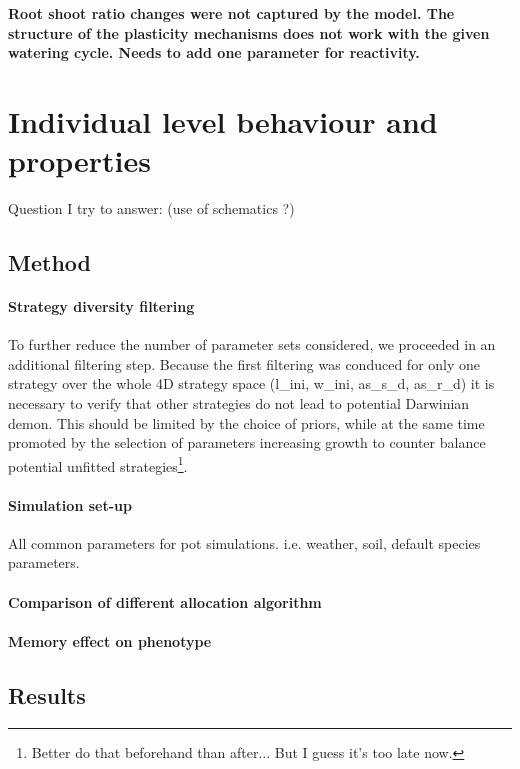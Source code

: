 \textbf{Root shoot ratio changes were not captured by the model. The structure of the plasticity mechanisms does not work with the given watering cycle. Needs to add one parameter for reactivity.}


\section{Individual level behaviour and properties}
Question I try to answer: (use of schematics ?)
\subsection{Method}


\paragraph{Strategy diversity filtering}
To further reduce the number of parameter sets considered, we proceeded in an additional filtering step. Because the first filtering was conduced for only one strategy over the whole 4D strategy space (l\_ini,  w\_ini, as\_s\_d, as\_r\_d) it is necessary to verify that other strategies do not lead to potential Darwinian demon. This should be limited by the choice of priors, while at the same time promoted by the selection of parameters increasing growth to counter balance potential unfitted strategies\footnote{Better do that beforehand than after... But I guess it's too late now.}.

\paragraph{Simulation set-up}
All common parameters for pot simulations. i.e. weather, soil, default species parameters.

\paragraph{Comparison of different allocation algorithm}

\paragraph{Memory effect on phenotype}

\subsection{Results}



